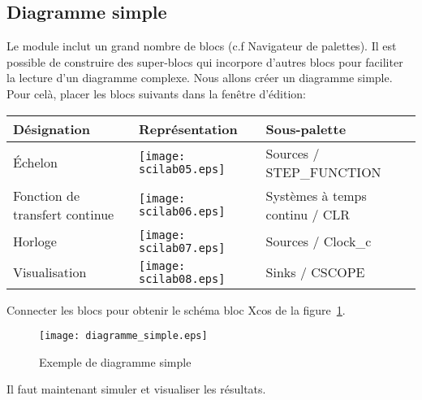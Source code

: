 \subsection{Diagramme simple}
Le module inclut un grand nombre de blocs (c.f Navigateur de palettes).
Il est possible de construire des super-blocs qui incorpore d'autres blocs pour
faciliter la lecture d'un diagramme complexe. \newline
Nous allons créer un diagramme simple. Pour celà, placer les blocs suivants 
dans la fenêtre d'édition:
\begin{table}[!h]
    \centering
    \begin{tabular}{@{}P{4cm}P{6cm}P{4cm}@{}}
    \toprule
    Désignation   & Représentation & Sous-palette \\
    \midrule
    \'Echelon     & 
    \begin{minipage}{6cm}
    \centering
    \texttt{[image: scilab05.eps]}
    \end{minipage} &
    Sources / STEP\_FUNCTION \\
    \midrule
    Fonction de transfert continue     & 
    \begin{minipage}{6cm}
    \centering
    \texttt{[image: scilab06.eps]}
    \end{minipage} & 
    Systèmes à temps continu / CLR \\
    \midrule
    Horloge       & 
    \begin{minipage}{6cm}
    \centering
    \texttt{[image: scilab07.eps]}
    \end{minipage} & 
    Sources / Clock\_c \\
    \midrule
    Visualisation & 
    \begin{minipage}{6cm}
    \centering
    \texttt{[image: scilab08.eps]}
    \end{minipage} & 
    Sinks / CSCOPE \\
    \bottomrule
\end{tabular}
\end{table}
Connecter les blocs pour obtenir le schéma bloc Xcos de la 
figure~\ref{fig-simple}.
\begin{figure}
    \centering
    \texttt{[image: diagramme\_simple.eps]}
    \caption{Exemple de diagramme simple\label{fig-simple}}
\end{figure}
Il faut maintenant simuler et visualiser les résultats.  
